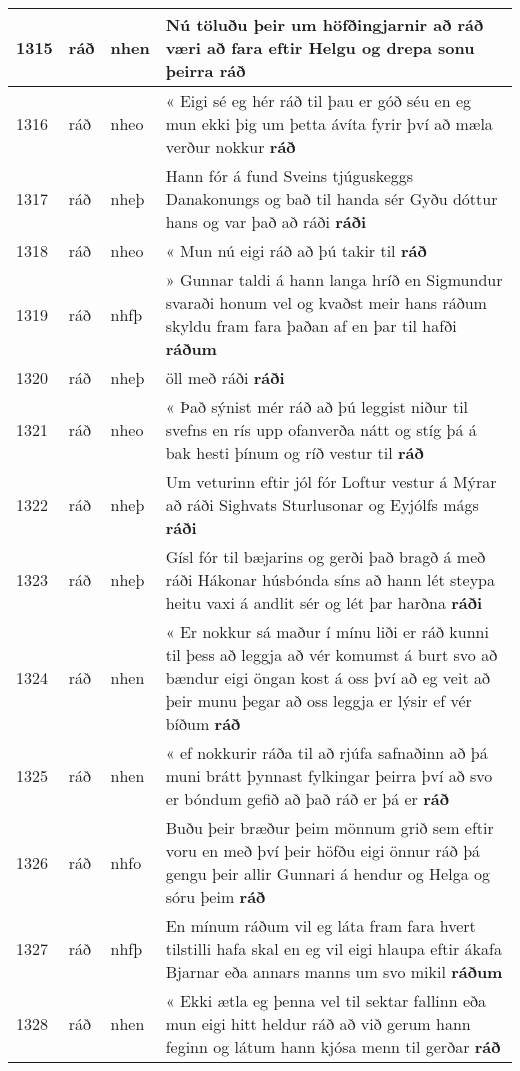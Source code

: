 \documentclass{article}
\begin{document}
\begin{longtable}{p{1cm}|p{1cm}|p{1cm}|p{13cm}}
\hline
1315&ráð&nhen&Nú töluðu þeir um höfðingjarnir að ráð væri að fara eftir Helgu og drepa sonu þeirra \textbf{ráð} \\
\hline
1316&ráð&nheo&« Eigi sé eg hér ráð til þau er góð séu en eg mun ekki þig um þetta ávíta fyrir því að mæla verður nokkur \textbf{ráð} \\
\hline
1317&ráð&nheþ&Hann fór á fund Sveins tjúguskeggs Danakonungs og bað til handa sér Gyðu dóttur hans og var það að ráði \textbf{ráði} \\
\hline
1318&ráð&nheo&« Mun nú eigi ráð að þú takir til \textbf{ráð} \\
\hline
1319&ráð&nhfþ&» Gunnar taldi á hann langa hríð en Sigmundur svaraði honum vel og kvaðst meir hans ráðum skyldu fram fara þaðan af en þar til hafði \textbf{ráðum} \\
\hline
1320&ráð&nheþ&öll með ráði \textbf{ráði} \\
\hline
1321&ráð&nheo&« Það sýnist mér ráð að þú leggist niður til svefns en rís upp ofanverða nátt og stíg þá á bak hesti þínum og ríð vestur til \textbf{ráð} \\
\hline
1322&ráð&nheþ&Um veturinn eftir jól fór Loftur vestur á Mýrar að ráði Sighvats Sturlusonar og Eyjólfs mágs \textbf{ráði} \\
\hline
1323&ráð&nheþ&Gísl fór til bæjarins og gerði það bragð á með ráði Hákonar húsbónda síns að hann lét steypa heitu vaxi á andlit sér og lét þar harðna \textbf{ráði} \\
\hline
1324&ráð&nhen&« Er nokkur sá maður í mínu liði er ráð kunni til þess að leggja að vér komumst á burt svo að bændur eigi öngan kost á oss því að eg veit að þeir munu þegar að oss leggja er lýsir ef vér bíðum \textbf{ráð} \\
\hline
1325&ráð&nhen&« ef nokkurir ráða til að rjúfa safnaðinn að þá muni brátt þynnast fylkingar þeirra því að svo er bóndum gefið að það ráð er þá er \textbf{ráð} \\
\hline
1326&ráð&nhfo&Buðu þeir bræður þeim mönnum grið sem eftir voru en með því þeir höfðu eigi önnur ráð þá gengu þeir allir Gunnari á hendur og Helga og sóru þeim \textbf{ráð} \\
\hline
1327&ráð&nhfþ&En mínum ráðum vil eg láta fram fara hvert tilstilli hafa skal en eg vil eigi hlaupa eftir ákafa Bjarnar eða annars manns um svo mikil \textbf{ráðum} \\
\hline
1328&ráð&nhen&« Ekki ætla eg þenna vel til sektar fallinn eða mun eigi hitt heldur ráð að við gerum hann feginn og látum hann kjósa menn til gerðar \textbf{ráð} \\

\end{longtable}
\end{document}

